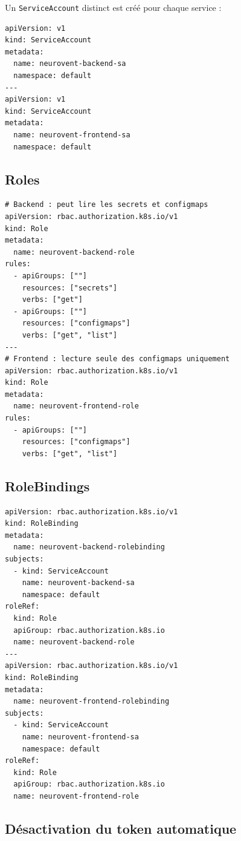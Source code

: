 \documentclass[12pt,a4paper]{article}
\begin{document}
Un \texttt{ServiceAccount} distinct est créé pour chaque service :

\begin{lstlisting}[style=yaml, caption={k8s/rbac.yaml — ServiceAccounts}]
apiVersion: v1
kind: ServiceAccount
metadata:
  name: neurovent-backend-sa
  namespace: default
---
apiVersion: v1
kind: ServiceAccount
metadata:
  name: neurovent-frontend-sa
  namespace: default
\end{lstlisting}

\subsection{Roles}

\begin{lstlisting}[style=yaml, caption={k8s/rbac.yaml — Roles}]
# Backend : peut lire les secrets et configmaps
apiVersion: rbac.authorization.k8s.io/v1
kind: Role
metadata:
  name: neurovent-backend-role
rules:
  - apiGroups: [""]
    resources: ["secrets"]
    verbs: ["get"]
  - apiGroups: [""]
    resources: ["configmaps"]
    verbs: ["get", "list"]
---
# Frontend : lecture seule des configmaps uniquement
apiVersion: rbac.authorization.k8s.io/v1
kind: Role
metadata:
  name: neurovent-frontend-role
rules:
  - apiGroups: [""]
    resources: ["configmaps"]
    verbs: ["get", "list"]
\end{lstlisting}

\subsection{RoleBindings}

\begin{lstlisting}[style=yaml, caption={k8s/rbac.yaml — RoleBindings}]
apiVersion: rbac.authorization.k8s.io/v1
kind: RoleBinding
metadata:
  name: neurovent-backend-rolebinding
subjects:
  - kind: ServiceAccount
    name: neurovent-backend-sa
    namespace: default
roleRef:
  kind: Role
  apiGroup: rbac.authorization.k8s.io
  name: neurovent-backend-role
---
apiVersion: rbac.authorization.k8s.io/v1
kind: RoleBinding
metadata:
  name: neurovent-frontend-rolebinding
subjects:
  - kind: ServiceAccount
    name: neurovent-frontend-sa
    namespace: default
roleRef:
  kind: Role
  apiGroup: rbac.authorization.k8s.io
  name: neurovent-frontend-role
\end{lstlisting}

\subsection{Désactivation du token automatique}
\end{document}
